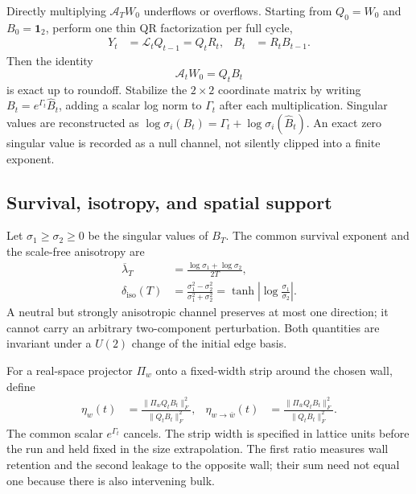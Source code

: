\documentclass[aps,prb,onecolumn,nofootinbib,superscriptaddress]{revtex4-2}
\newcommand{\I}{\mathbf{1}}
\newcommand{\cA}{\mathcal{A}}
\newcommand{\cL}{\mathcal{L}}
\begin{document}
Directly multiplying $\cA_TW_0$ underflows or overflows.  Starting from
$Q_0=W_0$ and $B_0=\I_2$, perform one thin QR factorization per full cycle,
\begin{align}
 Y_t&=\cL_t Q_{t-1}=Q_tR_t,
 &B_t&=R_tB_{t-1}.
 \label{eq:restricted-qr}
\end{align}
Then the identity
\begin{equation}
 \cA_tW_0=Q_tB_t
 \label{eq:factorization-identity}
\end{equation}
is exact up to roundoff.  Stabilize the $2\times2$ coordinate matrix by writing
$B_t=e^{\Gamma_t}\widehat B_t$, adding a scalar log norm to $\Gamma_t$ after
each multiplication.  Singular values are reconstructed as
$\log\sigma_i(B_t)=\Gamma_t+\log\sigma_i(\widehat B_t)$.  An exact zero
singular value is recorded as a null channel, not silently clipped into a
finite exponent.

\subsection{Survival, isotropy, and spatial support}

Let $\sigma_1\geq\sigma_2\geq0$ be the singular values of $B_T$.  The common
survival exponent and the scale-free anisotropy are
\begin{align}
 \overline\lambda_T
 &=\frac{\log\sigma_1+\log\sigma_2}{2T},
 \label{eq:survival}\\
 \delta_{\mathrm{iso}}(T)
 &=\frac{\sigma_1^2-\sigma_2^2}{\sigma_1^2+\sigma_2^2}
 =\tanh\!\left|\log\frac{\sigma_1}{\sigma_2}\right|.
 \label{eq:isotropy}
\end{align}
A neutral but strongly anisotropic channel preserves at most one direction;
it cannot carry an arbitrary two-component perturbation.  Both quantities are
invariant under a $U(2)$ change of the initial edge basis.

For a real-space projector $\Pi_w$ onto a fixed-width strip around the chosen
wall, define
\begin{align}
 \eta_w(t)&=\frac{\|\Pi_w Q_tB_t\|_F^2}{\|Q_tB_t\|_F^2},
 &\eta_{w\rightarrow\bar w}(t)
 &=\frac{\|\Pi_{\bar w}Q_tB_t\|_F^2}{\|Q_tB_t\|_F^2}.
 \label{eq:wall-retention}
\end{align}
The common scalar $e^{\Gamma_t}$ cancels.  The strip width is specified in
lattice units before the run and held fixed in the size extrapolation.  The
first ratio measures wall retention and the second leakage to the opposite
wall; their sum need not equal one because there is also intervening bulk.
\end{document}

